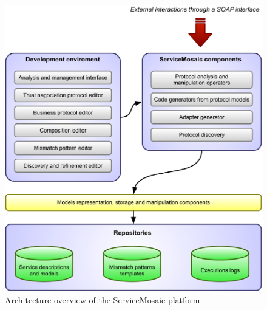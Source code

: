\begin{figure}[tbhp]
    \centering
    \includegraphics[width=\textwidth]{content/protocols-project/servicemosaic-architecture}
    \caption{Architecture overview of the ServiceMosaic platform.}
    \label{fig:servicemosaic-architecture}
\end{figure}

